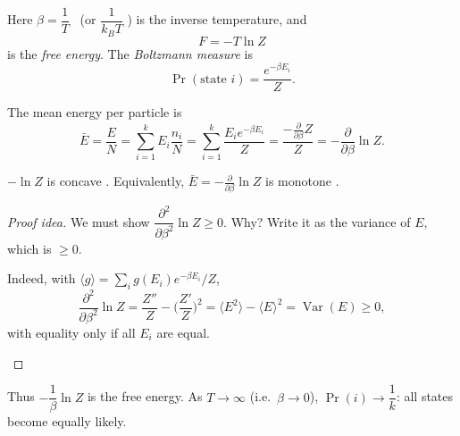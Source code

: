 \begin{definition}\label{L11:def:boltzmann}
Here $\beta=\dfrac1T$ \ (or $\dfrac{1}{k_BT}$ ) is the inverse temperature, and
\[
F=-T\ln Z
\]
is the \emph{free energy}. The \emph{Boltzmann measure} is
\[
\Pr(\text{state } i)=\frac{e^{-\beta E_i}}{Z}.
\]
\end{definition}

The mean energy per particle is
\[
\bar E=\frac EN=\sum_{i=1}^k E_i\frac{n_i}{N}
=\sum_{i=1}^k\frac{E_ie^{-\beta E_i}}{Z}
=\frac{-\frac{\partial}{\partial\beta}Z}{Z}
=-\frac{\partial}{\partial\beta}\ln Z.
\]

\begin{lemma}\label{L11:lem:concave}
$-\ln Z$ is concave . Equivalently, $\bar E=-\frac{\partial}{\partial\beta}\ln Z$ is monotone .
\end{lemma}
\begin{proof}[Proof idea]
We must show $\dfrac{\partial^2}{\partial\beta^2}\ln Z\ge0$. Why? Write it as the variance of $E$, which is $\ge0$.
\begin{addedblock}
Indeed, with $\langle g\rangle=\sum_i g(E_i)e^{-\beta E_i}/Z$,
\[
\frac{\partial^2}{\partial\beta^2}\ln Z=\frac{Z''}{Z}-\Big(\frac{Z'}{Z}\Big)^2=\langle E^2\rangle-\langle E\rangle^2=\operatorname{Var}(E)\ge0,
\]
with equality only if all $E_i$ are equal.
\end{addedblock}
\end{proof}

Thus $-\dfrac1\beta\ln Z$ is the free energy.
As $T\to\infty$ (i.e.\ $\beta\to0$), $\Pr(i)\to\dfrac1k$: all states become equally likely. 

\begin{remark}
\end{remark}


